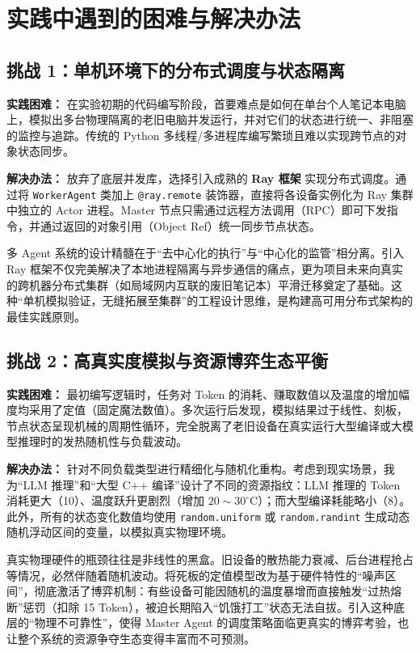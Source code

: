 \documentclass[11pt,a4paper]{ctexart}
\begin{document}
\section{实践中遇到的困难与解决办法}

\subsection{挑战 1：单机环境下的分布式调度与状态隔离}
\textbf{实践困难：} 在实验初期的代码编写阶段，首要难点是如何在单台个人笔记本电脑上，模拟出多台物理隔离的老旧电脑并发运行，并对它们的状态进行统一、非阻塞的监控与追踪。传统的 Python 多线程/多进程库编写繁琐且难以实现跨节点的对象状态同步。

\textbf{解决办法：} 放弃了底层并发库，选择引入成熟的 \textbf{Ray 框架} 实现分布式调度。通过将 \texttt{WorkerAgent} 类加上 \texttt{@ray.remote} 装饰器，直接将各设备实例化为 Ray 集群中独立的 Actor 进程。Master 节点只需通过远程方法调用（RPC）即可下发指令，并通过返回的对象引用（Object Ref）统一同步节点状态。

\begin{tcolorbox}[reflectionbox]
多 Agent 系统的设计精髓在于“去中心化的执行”与“中心化的监管”相分离。引入 Ray 框架不仅完美解决了本地进程隔离与异步通信的痛点，更为项目未来向真实的跨机器分布式集群（如局域网内互联的废旧笔记本）平滑迁移奠定了基础。这种“单机模拟验证，无缝拓展至集群”的工程设计思维，是构建高可用分布式架构的最佳实践原则。
\end{tcolorbox}

\subsection{挑战 2：高真实度模拟与资源博弈生态平衡}
\textbf{实践困难：} 最初编写逻辑时，任务对 Token 的消耗、赚取数值以及温度的增加幅度均采用了定值（固定魔法数值）。多次运行后发现，模拟结果过于线性、刻板，节点状态呈现机械的周期性循环，完全脱离了老旧设备在真实运行大型编译或大模型推理时的发热随机性与负载波动。

\textbf{解决办法：} 针对不同负载类型进行精细化与随机化重构。考虑到现实场景，我为“LLM 推理”和“大型 C++ 编译”设计了不同的资源指纹：LLM 推理的 Token 消耗更大（10）、温度跃升更剧烈（增加 $20 \sim 30^\circ\text{C}$）；而大型编译耗能略小（8）。此外，所有的状态变化数值均使用 \texttt{random.uniform} 或 \texttt{random.randint} 生成动态随机浮动区间的变量，以模拟真实物理环境。

\begin{tcolorbox}[reflectionbox]
真实物理硬件的瓶颈往往是非线性的黑盒。旧设备的散热能力衰减、后台进程抢占等情况，必然伴随着随机波动。将死板的定值模型改为基于硬件特性的“噪声区间”，彻底激活了博弈机制：有些设备可能因随机的温度暴增而直接触发“过热熔断”惩罚（扣除 15 Token），被迫长期陷入“饥饿打工”状态无法自拔。引入这种底层的“物理不可靠性”，使得 Master Agent 的调度策略面临更真实的博弈考验，也让整个系统的资源争夺生态变得丰富而不可预测。
\end{tcolorbox}
\end{document}

